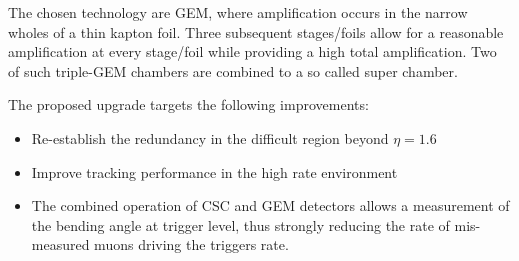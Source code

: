 The chosen technology are GEM, where amplification occurs in the narrow wholes of a thin kapton foil. Three subsequent stages/foils allow for a reasonable amplification at every stage/foil while providing a high total amplification. Two of such triple-GEM chambers are combined to a so called super chamber.

The proposed upgrade targets the following improvements:
	\begin{itemize}
		\item Re-establish the redundancy in the difficult region beyond $\eta = 1.6 $
		\item Improve tracking performance in the high rate environment
		\item The combined operation of CSC and GEM detectors allows a measurement of the bending angle at trigger level, thus strongly reducing the rate of mis-measured muons driving the triggers rate.
	\end{itemize}

